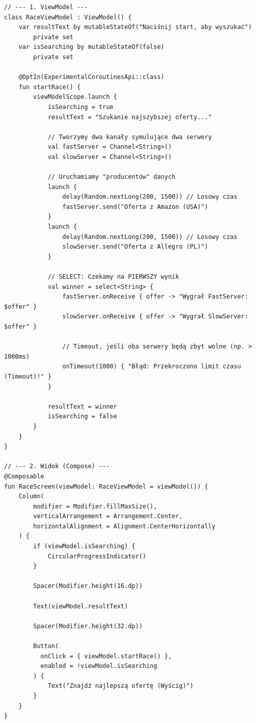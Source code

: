 \begin{verbatim}
// --- 1. ViewModel ---
class RaceViewModel : ViewModel() {
    var resultText by mutableStateOf("Naciśnij start, aby wyszukać")
        private set
    var isSearching by mutableStateOf(false)
        private set

    @OptIn(ExperimentalCoroutinesApi::class)
    fun startRace() {
        viewModelScope.launch {
            isSearching = true
            resultText = "Szukanie najszybszej oferty..."

            // Tworzymy dwa kanały symulujące dwa serwery
            val fastServer = Channel<String>()
            val slowServer = Channel<String>()

            // Uruchamiamy "producentów" danych
            launch {
                delay(Random.nextLong(200, 1500)) // Losowy czas
                fastServer.send("Oferta z Amazon (USA)")
            }
            launch {
                delay(Random.nextLong(200, 1500)) // Losowy czas
                slowServer.send("Oferta z Allegro (PL)")
            }

            // SELECT: Czekamy na PIERWSZY wynik
            val winner = select<String> {
                fastServer.onReceive { offer -> "Wygrał FastServer: $offer" }
                slowServer.onReceive { offer -> "Wygrał SlowServer: $offer" }
                
                // Timeout, jeśli oba serwery będą zbyt wolne (np. > 1000ms)
                onTimeout(1000) { "Błąd: Przekroczono limit czasu (Timeout)!" }
            }

            resultText = winner
            isSearching = false
        }
    }
}

// --- 2. Widok (Compose) ---
@Composable
fun RaceScreen(viewModel: RaceViewModel = viewModel()) {
    Column(
        modifier = Modifier.fillMaxSize(),
        verticalArrangement = Arrangement.Center,
        horizontalAlignment = Alignment.CenterHorizontally
    ) {
        if (viewModel.isSearching) {
            CircularProgressIndicator()
        }
        
        Spacer(Modifier.height(16.dp))
        
        Text(viewModel.resultText)
        
        Spacer(Modifier.height(32.dp))
        
        Button(
          onClick = { viewModel.startRace() }, 
          enabled = !viewModel.isSearching
        ) {
            Text("Znajdź najlepszą ofertę (Wyścig)")
        }
    }
}
\end{verbatim}